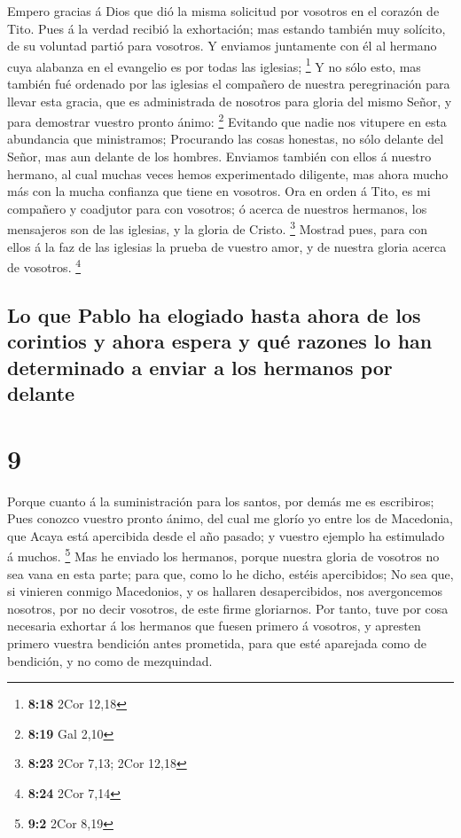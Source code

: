  Empero gracias á Dios que dió la misma solicitud por
vosotros en el corazón de Tito.  Pues á la verdad recibió
la exhortación; mas estando también muy solícito, de su voluntad partió
para vosotros.  Y enviamos juntamente con él al hermano
cuya alabanza en el evangelio es por todas las iglesias; \footnote{\textbf{8:18}
  2Cor 12,18}  Y no sólo esto, mas también fué ordenado
por las iglesias el compañero de nuestra peregrinación para llevar esta
gracia, que es administrada de nosotros para gloria del mismo Señor, y
para demostrar vuestro pronto ánimo: \footnote{\textbf{8:19} Gal 2,10}
 Evitando que nadie nos vitupere en esta abundancia que
ministramos;  Procurando las cosas honestas, no sólo
delante del Señor, mas aun delante de los hombres. 
Enviamos también con ellos á nuestro hermano, al cual muchas veces hemos
experimentado diligente, mas ahora mucho más con la mucha confianza que
tiene en vosotros.  Ora en orden á Tito, es mi compañero
y coadjutor para con vosotros; ó acerca de nuestros hermanos, los
mensajeros son de las iglesias, y la gloria de Cristo. \footnote{\textbf{8:23}
  2Cor 7,13; 2Cor 12,18}  Mostrad pues, para con ellos á
la faz de las iglesias la prueba de vuestro amor, y de nuestra gloria
acerca de vosotros. \footnote{\textbf{8:24} 2Cor 7,14}

\hypertarget{lo-que-pablo-ha-elogiado-hasta-ahora-de-los-corintios-y-ahora-espera-y-quuxe9-razones-lo-han-determinado-a-enviar-a-los-hermanos-por-delante}{%
\subsection{Lo que Pablo ha elogiado hasta ahora de los corintios y
ahora espera y qué razones lo han determinado a enviar a los hermanos
por
delante}\label{lo-que-pablo-ha-elogiado-hasta-ahora-de-los-corintios-y-ahora-espera-y-quuxe9-razones-lo-han-determinado-a-enviar-a-los-hermanos-por-delante}}

\hypertarget{section-8}{%
\section{9}\label{section-8}}

 Porque cuanto á la suministración para los santos, por
demás me es escribiros;  Pues conozco vuestro pronto
ánimo, del cual me glorío yo entre los de Macedonia, que Acaya está
apercibida desde el año pasado; y vuestro ejemplo ha estimulado á
muchos. \footnote{\textbf{9:2} 2Cor 8,19}  Mas he enviado
los hermanos, porque nuestra gloria de vosotros no sea vana en esta
parte; para que, como lo he dicho, estéis apercibidos;  No
sea que, si vinieren conmigo Macedonios, y os hallaren desapercibidos,
nos avergoncemos nosotros, por no decir vosotros, de este firme
gloriarnos.  Por tanto, tuve por cosa necesaria exhortar á
los hermanos que fuesen primero á vosotros, y apresten primero vuestra
bendición antes prometida, para que esté aparejada como de bendición, y
no como de mezquindad.

